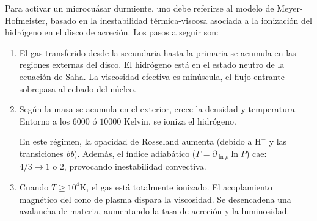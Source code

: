 Para activar un microcuásar durmiente, uno debe referirse al modelo de Meyer-Hofmeister, basado en la inestabilidad térmica-viscosa asociada a la ionización del hidrógeno en el disco de acreción. Los pasos a seguir son:

\begin{enumerate}
  \item El gas transferido desde la secundaria hasta la primaria se acumula en las regiones externas del disco. El hidrógeno está en el estado neutro de la ecuación de Saha. La viscosidad efectiva es minúscula, el flujo entrante sobrepasa al cebado del núcleo.
  \item Según la masa se acumula en el exterior, crece la densidad y temperatura. Entorno a los $6000$ ó $10000$ Kelvin, se ioniza el hidrógeno.
   
  En este régimen, la opacidad de Rosseland aumenta (debido a $\mbox{H}^-$ y las transiciones \textit{bb}). Además, el índice adiabático ($\Gamma=\partial_{\ln\rho}\ln P$) cae: $4/3\to 1\mbox{ o }2$, provocando inestabilidad convectiva.
  \item Cuando $T\geq 10^4\mbox{K}$, el gas está totalmente ionizado. El acoplamiento magnético del cono de plasma dispara la viscosidad. Se desencadena una avalancha de materia, aumentando la tasa de acreción y la luminosidad. 
\end{enumerate}


